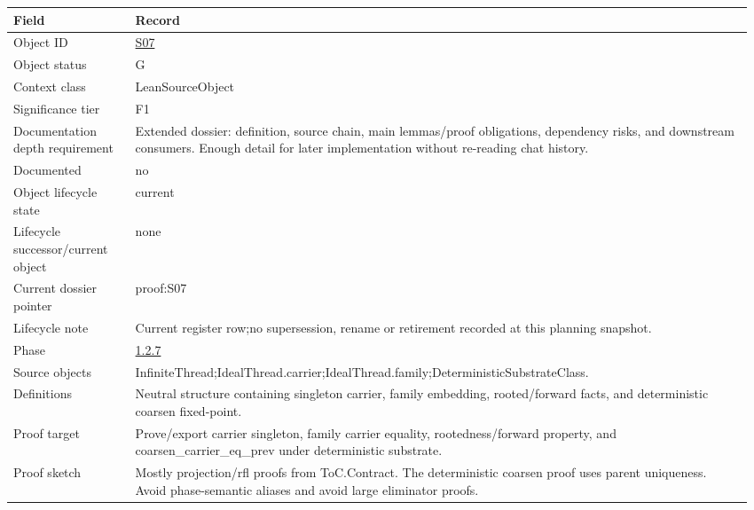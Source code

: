 \begin{longtable}{L{0.16\linewidth} L{0.81\linewidth}}
\hline
\textbf{Field} & \textbf{Record}\\
\hline
Object ID & \hyperlink{object-row-S07}{S07}\\
\hline\addlinespace[0.20em]
Object status & G\\
\hline\addlinespace[0.20em]
Context class & LeanSourceObject\\
\hline\addlinespace[0.20em]
Significance tier & F1\\
\hline\addlinespace[0.20em]
Documentation depth requirement & Extended dossier: definition, source chain, main lemmas/\allowbreak{}proof obligations, dependency risks, and downstream consumers. Enough detail for later implementation without re-reading chat history.\\
\hline\addlinespace[0.20em]
Documented & no\\
\hline\addlinespace[0.20em]
Object lifecycle state & current\\
\hline\addlinespace[0.20em]
Lifecycle successor/\allowbreak{}current object & none\\
\hline\addlinespace[0.20em]
Current dossier pointer & proof:S07\\
\hline\addlinespace[0.20em]
Lifecycle note & Current register row;\newline no supersession, rename or retirement recorded at this planning snapshot.\\
\hline\addlinespace[0.20em]
Phase & \hyperlink{phase-row-1-2-7}{1.2.7}\\
\hline\addlinespace[0.20em]
Source objects & InfiniteThread;\newline IdealThread.carrier;\newline IdealThread.family;\newline DeterministicSubstrateClass.\\
\hline\addlinespace[0.20em]
Definitions & Neutral structure containing singleton carrier, family embedding, rooted/\allowbreak{}forward facts, and deterministic coarsen fixed-point.\\
\hline\addlinespace[0.20em]
Proof target & Prove/\allowbreak{}export carrier singleton, family carrier equality, rootedness/\allowbreak{}forward property, and coarsen\_carrier\_eq\_prev under deterministic substrate.\\
\hline\addlinespace[0.20em]
Proof sketch & Mostly projection/\allowbreak{}rfl proofs from ToC.Contract. The deterministic coarsen proof uses parent uniqueness. Avoid phase-semantic aliases and avoid large eliminator proofs.\\

\end{longtable}
